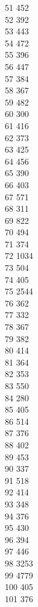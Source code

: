 { 51	452 \\
 52	392 \\
 53	443 \\
 54	472 \\
 55	396 \\
 56	447 \\
 57	384 \\
 58	367 \\
 59	482 \\
 60	300 \\
 61	416 \\
 62	373 \\
 63	425 \\
 64	456 \\
 65	390 \\
 66	403 \\
 67	571 \\
 68	311 \\
 69	822 \\
 70	494 \\
 71	374 \\
 72	1034 \\
 73	504 \\
 74	405 \\
 75	2544 \\
 76	362 \\
 77	332 \\
 78	367 \\
 79	382 \\
 80	414 \\
 81	364 \\
 82	353 \\
 83	550 \\
 84	280 \\
 85	405 \\
 86	514 \\
 87	376 \\
 88	402 \\
 89	453 \\
 90	337 \\
 91	518 \\
 92	414 \\
 93	348 \\
 94	376 \\
 95	430 \\
 96	394 \\
 97	446 \\
 98	3253 \\
 99	4779 \\
 100	405 \\
 101	376 \\
}
